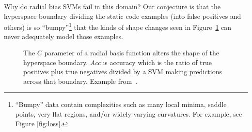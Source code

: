  

Why do radial bias SVMs fail in this domain?  Our  conjecture is that the hyperspace boundary dividing the static code examples (into false positives and others)
is so ``bumpy''\footnote{``Bumpy'' data 
  contain complexities such
as many local minima, saddle points, very flat regions,
and/or widely varying curvatures. For example, see  Figure \ref{fig:loss}.}
that the kinds of shape changes seen
in   Figure~\ref{cg} can never adequately model those  examples.

\begin{figure}[!t]

\caption{The $C$  parameter of a radial basis function alters
the shape of the hyperspace boundary.  {\em Acc} is accuracy which is the ratio of true positives plus true negatives divided by a SVM making predictions across that boundary. Example from~\cite{kumar20}.}\label{cg}
\end{figure}

